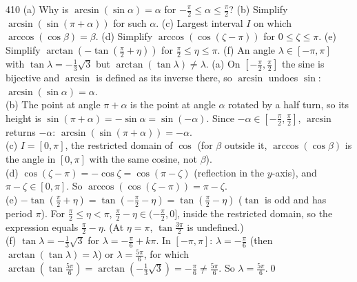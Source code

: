 \begin{bookex}{410}
(a) Why is $\arcsin(\sin\alpha)=\alpha$ for $-\frac\pi2\le\alpha\le\frac\pi2$? (b) Simplify $\arcsin(\sin(\pi+\alpha))$ for such $\alpha$. (c) Largest interval $I$ on which $\arccos(\cos\beta)=\beta$. (d) Simplify $\arccos(\cos(\zeta-\pi))$ for $0\le\zeta\le\pi$. (e) Simplify $\arctan(-\tan(\frac\pi2+\eta))$ for $\frac\pi2\le\eta\le\pi$. (f) An angle $\lambda\in[-\pi,\pi]$ with $\tan\lambda=-\frac13\sqrt3$ but $\arctan(\tan\lambda)\ne\lambda$.
\solution
(a) On $[-\frac\pi2,\frac\pi2]$ the sine is bijective and $\arcsin$ is defined as its inverse there, so $\arcsin$ undoes $\sin$: $\arcsin(\sin\alpha)=\alpha$.\\
(b) The point at angle $\pi+\alpha$ is the point at angle $\alpha$ rotated by a half turn, so its height is $\sin(\pi+\alpha)=-\sin\alpha=\sin(-\alpha)$. Since $-\alpha\in[-\frac\pi2,\frac\pi2]$, $\arcsin$ returns $-\alpha$: $\arcsin(\sin(\pi+\alpha))=-\alpha$.\\
(c) $I=[0,\pi]$, the restricted domain of $\cos$ (for $\beta$ outside it, $\arccos(\cos\beta)$ is the angle in $[0,\pi]$ with the same cosine, not $\beta$).\\
(d) $\cos(\zeta-\pi)=-\cos\zeta=\cos(\pi-\zeta)$ (reflection in the $y$-axis), and $\pi-\zeta\in[0,\pi]$. So $\arccos(\cos(\zeta-\pi))=\pi-\zeta$.\\
(e) $-\tan(\frac\pi2+\eta)=\tan(-\frac\pi2-\eta)=\tan(\frac\pi2-\eta)$ ($\tan$ is odd and has period $\pi$). For $\frac\pi2\le\eta<\pi$, $\frac\pi2-\eta\in(-\frac\pi2,0]$, inside the restricted domain, so the expression equals $\frac\pi2-\eta$. (At $\eta=\pi$, $\tan\frac{3\pi}2$ is undefined.)\\
(f) $\tan\lambda=-\frac13\sqrt3$ for $\lambda=-\frac\pi6+k\pi$. In $[-\pi,\pi]$: $\lambda=-\frac\pi6$ (then $\arctan(\tan\lambda)=\lambda$) or $\lambda=\frac{5\pi}6$, for which $\arctan(\tan\frac{5\pi}6)=\arctan(-\frac13\sqrt3)=-\frac\pi6\ne\frac{5\pi}6$. So $\lambda=\frac{5\pi}6$.\qed
\end{bookex}


